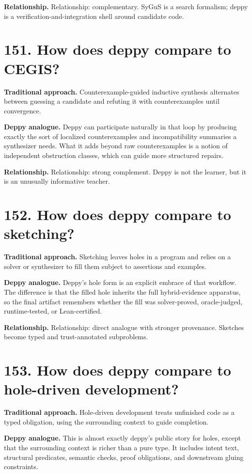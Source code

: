 \documentclass[11pt,openany]{book}
\begin{document}
\textbf{Relationship.} Relationship: complementary. SyGuS is a search formalism; deppy is a verification-and-integration shell around candidate code.

\section*{151. How does deppy compare to CEGIS?}
\textbf{Traditional approach.} Counterexample-guided inductive synthesis alternates between guessing a candidate and refuting it with counterexamples until convergence.

\textbf{Deppy analogue.} Deppy can participate naturally in that loop by producing exactly the sort of localized counterexamples and incompatibility summaries a synthesizer needs. What it adds beyond raw counterexamples is a notion of independent obstruction classes, which can guide more structured repairs.

\textbf{Relationship.} Relationship: strong complement. Deppy is not the learner, but it is an unusually informative teacher.

\section*{152. How does deppy compare to sketching?}
\textbf{Traditional approach.} Sketching leaves holes in a program and relies on a solver or synthesizer to fill them subject to assertions and examples.

\textbf{Deppy analogue.} Deppy's hole form is an explicit embrace of that workflow. The difference is that the filled hole inherits the full hybrid-evidence apparatus, so the final artifact remembers whether the fill was solver-proved, oracle-judged, runtime-tested, or Lean-certified.

\textbf{Relationship.} Relationship: direct analogue with stronger provenance. Sketches become typed and trust-annotated subproblems.

\section*{153. How does deppy compare to hole-driven development?}
\textbf{Traditional approach.} Hole-driven development treats unfinished code as a typed obligation, using the surrounding context to guide completion.

\textbf{Deppy analogue.} This is almost exactly deppy's public story for holes, except that the surrounding context is richer than a pure type. It includes intent text, structural predicates, semantic checks, proof obligations, and downstream gluing constraints.
\end{document}
